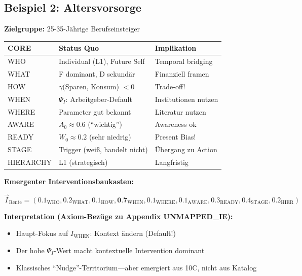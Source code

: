 \subsection{Beispiel 2: Altersvorsorge}
\label{sec:17-example-retirement}

\begin{tcolorbox}[colback=green!5!white, colframe=green!75!black,
    title=\textbf{10C Status Quo: Altersvorsorge}]

\textbf{Zielgruppe:} 25-35-J\"{a}hrige Berufseinsteiger

\begin{center}
\renewcommand{\arraystretch}{1.2}
\small
\begin{tabular}{@{}lll@{}}
\toprule
\textbf{CORE} & \textbf{Status Quo} & \textbf{Implikation} \\
\midrule
WHO & Individual (L1), Future Self & Temporal bridging \\
WHAT & F dominant, D sekund\"{a}r & Finanziell framen \\
HOW & $\gamma$(Sparen, Konsum) $< 0$ & Trade-off! \\
WHEN & $\Psi_I$: Arbeitgeber-Default & Institutionen nutzen \\
WHERE & Parameter gut bekannt & Literatur nutzen \\
AWARE & $A_0 \approx 0.6$ (``wichtig'') & Awareness ok \\
READY & $W_0 \approx 0.2$ (sehr niedrig) & Present Bias! \\
STAGE & Trigger (wei\ss{}, handelt nicht) & \"{U}bergang zu Action \\
HIERARCHY & L1 (strategisch) & Langfristig \\
\bottomrule
\end{tabular}
\end{center}

\end{tcolorbox}

\textbf{Emergenter Interventionsbaukasten:}

\begin{equation}
\vec{I}_{\text{Rente}} = (0.1_{\text{WHO}}, 0.2_{\text{WHAT}}, 0.1_{\text{HOW}}, \textbf{0.7}_{\text{WHEN}}, 0.1_{\text{WHERE}}, 0.1_{\text{AWARE}}, 0.3_{\text{READY}}, 0.4_{\text{STAGE}}, 0.2_{\text{HIER}})
\end{equation}

\textbf{Interpretation (Axiom-Bezüge zu Appendix UNMAPPED_IE):}
\begin{itemize}[nosep]
\item Haupt-Fokus auf $I_{\text{WHEN}}$: Kontext \"{a}ndern (Default!)
\item Der hohe $\Psi_I$-Wert macht kontextuelle Intervention dominant
\item Klassisches ``Nudge''-Territorium---aber emergiert aus 10C, nicht aus Katalog
\end{itemize}

